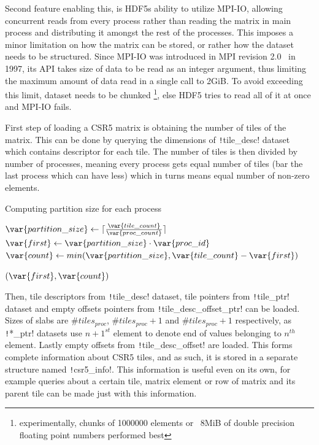 \documentclass[thesis=M,english]{FITthesis}[2019/12/23]
\newcommand{\csre}[1]{\texttt!#1!}
\begin{document}
Second feature enabling this, is HDF5s ability to utilize MPI-IO, allowing concurrent
reads from every process rather than reading the matrix in main process
and distributing it amongst the rest of the processes. This imposes a minor limitation
on how the matrix can be stored, or rather how the dataset needs to be structured.
Since MPI-IO was introduced in MPI revision 2.0~\cite{mpi20} in 1997, its API takes
size of data to be read as an integer argument, thus limiting the maximum amount of data read
in a single call to 2GiB. To avoid exceeding this limit, dataset needs to be chunked
\footnote{experimentally, chunks of 1000000 elements or ~8MiB of double precision floating
    point numbers performed best}, else HDF5 tries to read all of it at once and MPI-IO fails.


First step of loading a CSR5 matrix is obtaining the number of tiles of the matrix. This can be
done by querying the dimensions of \csre{tile_desc} dataset which contains descriptor for each tile.
The number of tiles is then divided by number of processes, meaning every process gets equal
number of tiles (bar the last process which can have less) which in turns means equal number
of non-zero elements.


\begin{algorithm}
    \caption{Computing partition size for each process}
    \begin{algorithmic}
        \State $\var{partition\_size} \gets \lceil\frac{\var{tile\_count}}{\var{proc\_count}}\rceil$
        \State \(\var{first} \gets \var{partition\_size} \cdot \var{proc\_id}\)
        \State $\var{count} \gets min(\var{partition\_size}, \var{tile\_count} - \var{first})$

        \Return $(\var{first}, \var{count})$
        \EndFunction
    \end{algorithmic}
\end{algorithm}

Then, tile descriptors from \csre{tile_desc} dataset, tile pointers from \csre{tile_ptr}
dataset and empty offsets pointers from \csre{tile_desc_offset_ptr} can be loaded.
Sizes of slabs are $\#tiles_{proc}$, $\#tiles_{proc} + 1$ and $\#tiles_{proc} + 1$
respectively, as \csre{*_ptr} datasets use $n+1^{st}$ element to denote end of values
belonging to $n^{th}$ element. Lastly empty offsets from \csre{tile_desc_offset}
are loaded. This forms complete information about CSR5 tiles, and as such, it is
stored in a separate structure named \csre{csr5_info}. This information is useful
even on its own, for example queries about a certain tile, matrix element or row
of matrix and its parent tile can be made just with this information.
\end{document}
